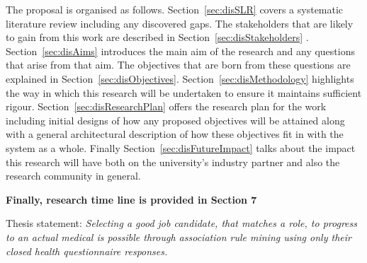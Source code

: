 The proposal is organised as follows. Section~\ref{sec:disSLR} covers a systematic literature review including any discovered gaps. The stakeholders that are likely to gain from this work are described in Section~\ref{sec:disStakeholders}
. Section~\ref{sec:disAims} introduces the main aim of the research and any questions that arise from that aim.
The objectives that are born from these questions are explained in Section~\ref{sec:disObjectives}. Section~\ref{sec:disMethodology} highlights the way in which this research will be undertaken to ensure it maintains sufficient rigour. Section~\ref{sec:disResearchPlan} offers the research plan for the work including initial designs of how any proposed objectives will be attained along with a general architectural description of how these objectives fit in with the system as a whole. Finally Section~\ref{sec:disFutureImpact} talks about the impact this research will have both on the university's industry partner and also the research community in general.

\textbf{Finally, research time line is provided in Section 7}


\par
\noindent
Thesis statement: \textit{Selecting a good job candidate, that matches a role, to progress to an actual medical is possible through association rule mining using only their closed health questionnaire responses.}


